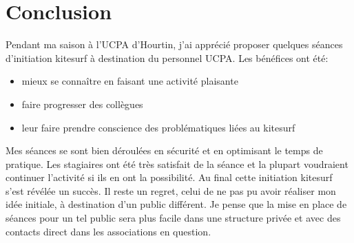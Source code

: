 \documentclass[12pt,a4paper]{report}
\begin{document}
\section{Conclusion}

Pendant ma saison à l'UCPA d'Hourtin, j'ai apprécié proposer quelques 
séances d'initiation kitesurf à destination du personnel UCPA.
Les bénéfices ont été:
\begin{itemize}
\item mieux se connaître en faisant une activité plaisante
\item faire progresser des collègues
\item leur faire prendre conscience  des problématiques liées au kitesurf
\end{itemize}

Mes séances se sont bien déroulées en sécurité et en optimisant 
le temps de pratique. Les stagiaires ont été très satisfait de la 
séance et la plupart voudraient continuer l'activité si ils en 
ont la possibilité. 
Au final cette initiation kitesurf s'est révélée un succès.
Il reste un regret, celui de ne pas pu avoir réaliser mon idée initiale, 
à destination d'un public différent. Je pense que la mise en place de séances
pour un tel public sera plus facile dans une structure privée et avec des
contacts direct dans les associations en question.





\end{document}
